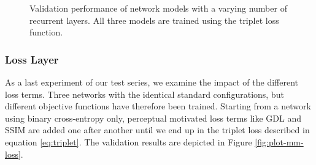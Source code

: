 \begin{figure}[htb]
\begin{subfigure}{0.5\textwidth}
{
  }
  \caption{}
  \label{fig:plot-mm-layer-psnr}
\end{subfigure}
\caption[Influences of ConvLSTM Layers]{Validation performance of network models with a varying number of recurrent layers. All three models are trained using the triplet loss function.} \label{fig:plot-mm-layer}
\end{figure}



\subsubsection*{Loss Layer}

As a last experiment of our test series, we examine the impact of the different loss terms. Three networks with the identical standard configurations, but different objective functions have therefore been trained. Starting from a network using binary cross-entropy only, perceptual motivated loss terms like GDL and SSIM are added one after another until we end up in the triplet loss described in equation \ref{eq:triplet}. The validation results are depicted in Figure \ref{fig:plot-mm-loss}.

